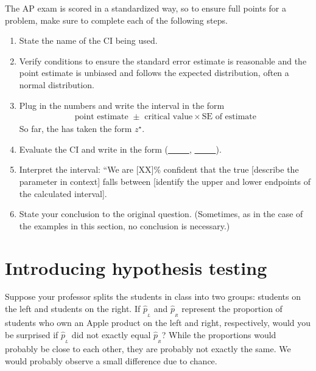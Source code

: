 \begin{termBox}{
The AP exam is scored in a standardized way, so to ensure full points for a problem, make sure to complete each of the following steps.
\begin{enumerate}
\setlength{\itemsep}{0mm}
\item State the name of the CI being used.
\item Verify conditions to ensure the standard error estimate is reasonable and the point estimate is unbiased and follows the expected distribution, often a normal distribution.
\item Plug in the numbers and write the interval in the form\vspace{-1mm}
\begin{align*}
\text{point estimate } \pm \text{ critical value}\times \text{SE of estimate}
\end{align*}\vspace{-1mm}%
So far, the  has taken the form $z^\star$.
\item Evaluate the CI and write in the form (\underline{\ \ \ \ \ }, \underline{\ \ \ \ \ }).
\item Interpret the interval: ``We are [XX]\% confident that the true [describe the parameter in context] falls between [identify the upper and lower endpoints of the calculated interval].
\item State your conclusion to the original question. (Sometimes, as in the case of the examples in this section, no conclusion is necessary.)
\end{enumerate}}
\end{termBox}




\section[Introducing hypothesis testing]{Introducing hypothesis testing }


\begin{example}{Suppose your professor splits the students in class into two groups: students on the left and students on the right. If $\hat{p}_{_L}$ and $\hat{p}_{_R}$ represent the proportion of students who own an Apple product on the left and right, respectively, would you be surprised if $\hat{p}_{_L}$ did not {exactly} equal $\hat{p}_{_R}$?}
While the proportions would probably be close to each other, they are probably not exactly the same. We would probably observe a small difference due to {chance}.
\end{example}

